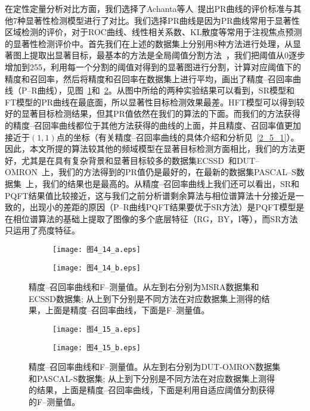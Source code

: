 在定性定量分析对比方面，我们选择了Achanta等人~\cite{AchantaCVPR2009Frequency}提出PR曲线的评价标准与其他7种显著性检测模型进行了对比。我们选择PR曲线是因为PR曲线常用于显著性区域检测的评价，对于ROC曲线、线性相关系数、KL散度等常用于注视焦点预测的显著性检测评价中。首先我们在上述的数据集上分别用8种方法进行处理，从显著图上提取出显著目标，最基本的方法是全局阈值分割方法~\cite{王岩2012注意}，我们把阈值从0逐步增加到255，利用每一个分割的阈值对得到的显著图进行分割，计算对应阈值下的精度和召回率，然后将精度和召回率在数据集上进行平均，画出了精度--召回率曲线（P--R曲线），见图~\ref{图4_14}和~\ref{图4_15}。从图中所给的两种实验结果可以看到，SR模型和FT模型的PR曲线在最底面，所以显著性目标检测效果最差。HFT模型可以得到较好的显著目标检测结果，但其PR值依然在我们的算法的下面。而我们的方法获得的精度--召回率曲线都位于其他方法获得的曲线的上面，并且精度、召回率值更加接近于$(1,1)$点的坐标（有关精度--召回率曲线的具体介绍和分析见~\ref{2_5_1}）。因此，本文所提的算法较其他的频域模型在显著目标检测方面相比，我们的方法更好，尤其是在具有复杂背景和显著目标较多的数据集ECSSD~\cite{YanQiongCVPR2013Hierarchical}和DUT--OMRON~\cite{YangChuanCVPR2013Manifold}上，我们的方法得到的PR值仍是最好的，在最新的数据集PASCAL--S数据集~\cite{LiYinCVPR2014Secrets}上，我们的结果也是最高的。从精度--召回率曲线上我们还可以看出，SR和PQFT结果值比较接近，这与我们之前分析谱剩余算法与相位谱算法十分接近是一致的，出现小的差距的原因（P--R曲线PQFT结果要优于SR方法）是PQFT模型是在相位谱算法的基础上提取了图像的多个底层特征（RG，BY，I等），而SR方法只运用了亮度特征。
\begin{figure}[h]
  \centering%
  \begin{subfigure}{5.5cm}
    \texttt{[image: 图4\_14\_a.eps]}
    \caption{}
  \end{subfigure}
  \hspace{4em}%
  \begin{subfigure}{0.45\textwidth}
    \texttt{[image: 图4\_14\_b.eps]}
    \caption{}
  \end{subfigure}
  \caption{精度--召回率曲线和F--测量值。从左到右分别为MSRA数据集和ECSSD数据集; 从上到下分别是不同方法在对应数据集上测得的结果，上面是精度--召回率曲线，下面是F--测量值。}
  \label{图4_14}
\end{figure}
\begin{figure}[h]
  \centering%
  \begin{subfigure}{5.5cm}
    \texttt{[image: 图4\_15\_a.eps]}
    \caption{}
  \end{subfigure}
  \hspace{4em}%
  \begin{subfigure}{0.45\textwidth}
    \texttt{[image: 图4\_15\_b.eps]}
    \caption{}
  \end{subfigure}
  \caption{精度--召回率曲线和F--测量值。从左到右分别为DUT-OMRON数据集和PASCAL-S数据集; 从上到下分别是不同方法在对应数据集上测得的结果，上面是精度--召回率曲线，下面是利用自适应阈值分割获得的F--测量值。}
  \label{图4_15}
\end{figure}

